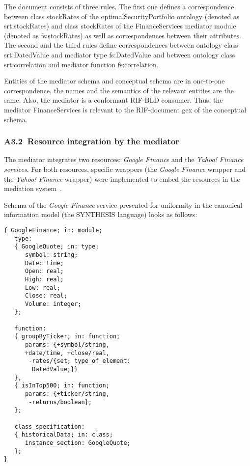   \begin{multicols}{2}
{\small
 The document consists of three rules. The first one defines a correspondence
between class {\sf stockRates} of the {\sf optimalSecurityPortfolio} ontology
(denoted as {\sf srt:stockRates}) and class {\sf stockRates} of the
{\sf FinanceServices} mediator module (denoted as {\sf fs:stockRates}) as well as
correspondences between their attributes. The second and the third rules define
correspondences between ontology class {\sf srt:DatedValue} and mediator type {\sf
fs:DatedValue} and between ontology class {\sf srt:correlation} and mediator
function {\sf fs:correlation}.

  Entities of the mediator schema and conceptual schema are in one-to-one
correspondence, the names and the semantics of the relevant entities are the same.
Also, the mediator is a conformant RIF-BLD consumer. Thus, the mediator
{\sf FinanceServices} is relevant to the RIF-document {\sf gex} of the
conceptual schema.

\subsubsection*{A3.2\  Resource integration by the mediator}

  \noindent
 The mediator integrates two resources: \textit{Google Finance} and the
\textit{Yahoo! Finance services}. For both resources, specific wrappers (the
\textit{Google Finance} wrapper and the \textit{Yahoo! Finance} wrapper) were
implemented to embed the resources in the mediation system~\cite{33-kal}.

  Schema of the \textit{Google Finance} service presented for uniformity in the
canonical information model (the SYNTHESIS language) looks as follows:
}


{\small
  \begin{verbatim}
{ GoogleFinance; in: module;
   type:
   { GoogleQuote; in: type;
      symbol: string;
      Date: time;
      Open: real;
      High: real;
      Low: real;
      Close: real;
      Volume: integer;
   };

   function:
   { groupByTicker; in: function;
      params: {+symbol/string, 
      +date/time, +close/real,
       -rates/{set; type_of_element: 
        DatedValue;}}
   },
   { isInTop500; in: function;
      params: {+ticker/string, 
       -returns/boolean};
   };

   class_specification:
   { historicalData; in: class;
      instance_section: GoogleQuote;
   };
}
  \end{verbatim}
 } 
 

\end{multicols}
